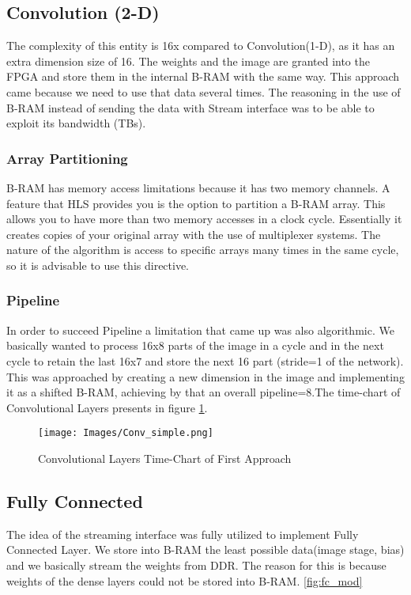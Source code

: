 \subsection {Convolution (2-D)}

The complexity of this entity is 16x compared to Convolution(1-D), as it has an extra dimension size of 16. The weights and the image are granted into the FPGA and store them in the internal B-RAM with the same way. This approach came because we need to use that data several times. The reasoning in the use of B-RAM instead of sending the data with Stream interface was to be able to exploit its bandwidth (TBs).

\subsubsection{Array Partitioning}
B-RAM has memory access limitations because it has two memory channels. A feature that HLS provides you is the option to partition a B-RAM array. This allows you to have more than two memory accesses in a clock cycle. Essentially it creates copies of your original array with the use of multiplexer systems. The nature of the algorithm is access to specific arrays many times in the same cycle, so it is advisable to use this directive.

\subsubsection{Pipeline}
In order to succeed Pipeline a limitation that came up was also algorithmic. We basically wanted to process 16x8 parts of the image in a cycle and in the next cycle to retain the last 16x7 and store the next 16 part (stride=1 of the network). This was approached by creating a new dimension in the image and implementing it as a shifted B-RAM, achieving by that an overall pipeline=8.The time-chart of Convolutional Layers presents in figure \ref{fig:conv_simple}.

 \begin{figure}[h]
\centering
\texttt{[image: Images/Conv\_simple.png]} 
\decoRule
\caption[Convolutional Layers Time-Chart (FA)]{Convolutional Layers Time-Chart of First Approach}
\label{fig:conv_simple}
\end{figure}

\subsection {Fully Connected}
The idea of the streaming interface was fully utilized to implement Fully Connected Layer. We store into B-RAM the least possible data(image stage, bias) and we basically stream the weights from DDR. The reason for this is because weights of the dense layers could not be stored into B-RAM. \ref{fig:fc_mod}


